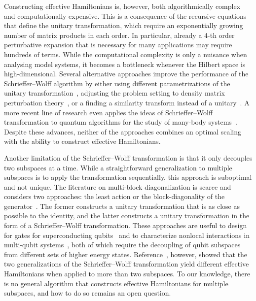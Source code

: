 Constructing effective Hamiltonians is, however, both algorithmically complex and computationally expensive.
This is a consequence of the recursive equations that define the unitary transformation, which require an exponentially growing number of matrix products in each order.
In particular, already a 4-th order perturbative expansion that is necessary for many applications may require hundreds of terms.
While the computational complexity is only a nuisance when analysing model systems, it becomes a bottleneck whenever the Hilbert space is high-dimensional.
Several alternative approaches improve the performance of the Schrieffer--Wolff algorithm by either using different parametrizations of the unitary transformation~\cite{Van_Vleck_1929, Shavitt_1980, Lowdin_1962, Klein_1974, Suzuki_1983}, adjusting the problem setting to density matrix perturbation theory~\cite{McWeeny_1962, Truflandier_2020}, or a finding a similarity transform instead of a unitary~\cite{Bloch_1958}.
A more recent line of research even applies the ideas of Schrieffer--Wolff transformation to quantum algorithms for the study of many-body systems~\cite{Wurtz_2020, Zhang_2022}.
Despite these advances, neither of the approaches combines an optimal scaling with the ability to construct effective Hamiltonians.

Another limitation of the Schrieffer--Wolff transformation is that it only decouples two subspaces at a time.
While a straightforward generalization to multiple subspaces is to apply the transformation sequentially, this approach is suboptimal and not unique.
The literature on multi-block diagonalization is scarce and considers two approaches: the least action or the block-diagonality of the generator~\cite{Mankodi_2024}.
The former constructs a unitary transformation that is as close as possible to the identity, and the latter constructs a unitary transformation in the form of a Schrieffer--Wolff transformation.
These approaches are useful to design for gates for superconducting qubits~\cite{Magesan_2020} and to characterize nonlocal interactions in multi-qubit systems~\cite{Xu_2024}, both of which require the decoupling of qubit subspaces from different sets of higher energy states.
Reference~\cite{Mankodi_2024}, however, showed that the two generalizations of the Schrieffer--Wolff transformation yield different effective Hamiltonians when applied to more than two subspaces.
To our knowledge, there is no general algorithm that constructs effective Hamiltonians for multiple subspaces, and how to do so remains an open question.

